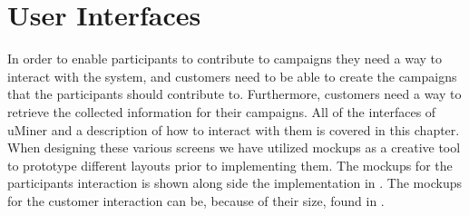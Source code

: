 
\chapter{User Interfaces}
\label{cha:user_interfaces}

In order to enable participants to contribute to campaigns they need a way to interact with the system, and customers need to be able to create the campaigns that the participants should contribute to. Furthermore, customers need a way to retrieve the collected information for their campaigns. All of the interfaces of uMiner and a description of how to interact with them is covered in this chapter. When designing these various screens we have utilized mockups as a creative tool to prototype different layouts prior to implementing them. The mockups for the participants interaction is shown along side the implementation in . The mockups for the customer interaction can be, because of their size, found in .



